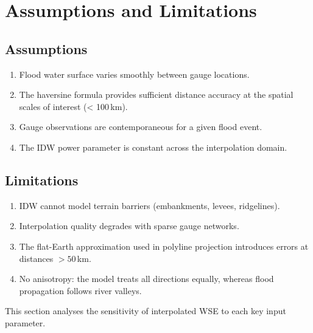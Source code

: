 \documentclass[11pt,a4paper]{article}
\begin{document}
\section{Assumptions and Limitations}

\subsection{Assumptions}
\begin{enumerate}[nosep]
    \item Flood water surface varies smoothly between gauge locations.
    \item The haversine formula provides sufficient distance accuracy at the
          spatial scales of interest (< 100\,km).
    \item Gauge observations are contemporaneous for a given flood event.
    \item The IDW power parameter is constant across the interpolation domain.
\end{enumerate}

\subsection{Limitations}
\begin{enumerate}[nosep]
    \item IDW cannot model terrain barriers (embankments, levees, ridgelines).
    \item Interpolation quality degrades with sparse gauge networks.
    \item The flat-Earth approximation used in polyline projection introduces
          errors at distances $> 50$\,km.
    \item No anisotropy: the model treats all directions equally, whereas
          flood propagation follows river valleys.
\end{enumerate}


\mkmsensitivity

This section analyses the sensitivity of interpolated WSE to each key input
parameter.




\end{document}
